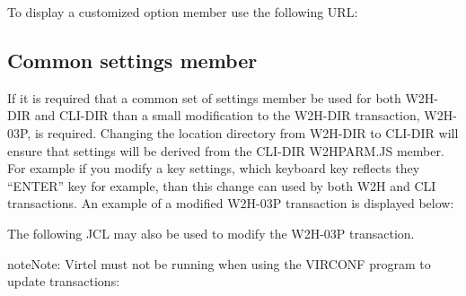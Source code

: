\documentclass[letterpaper,10pt,english]{sphinxmanual}
\begin{document}
To display a customized option member use the following URL:

\begin{sphinxVerbatim}[commandchars=\\\{\}]
\end{sphinxVerbatim}


\ignorespaces 

\subsection{Common settings member}
\label{\detokenize{Customization:common-settings-member}}\label{\detokenize{Customization:index-3}}
If it is required that a common set of settings member be used for both W2H-DIR and CLI-DIR than a small modification to the W2H-DIR transaction, W2H-03P, is required. Changing the location directory from W2H-DIR to CLI-DIR will ensure that settings will be derived from the CLI-DIR W2HPARM.JS member. For example if you modify a key settings, which keyboard key reflects they “ENTER” key for example, than this change can used by both W2H and CLI transactions. An example of a modified W2H-03P transaction is displayed below:



The following JCL may also be used to modify the W2H-03P transaction.

\begin{sphinxadmonition}{note}{Note:}
Virtel must not be running when using the VIRCONF program to update transactions:
\end{sphinxadmonition}
\end{document}
